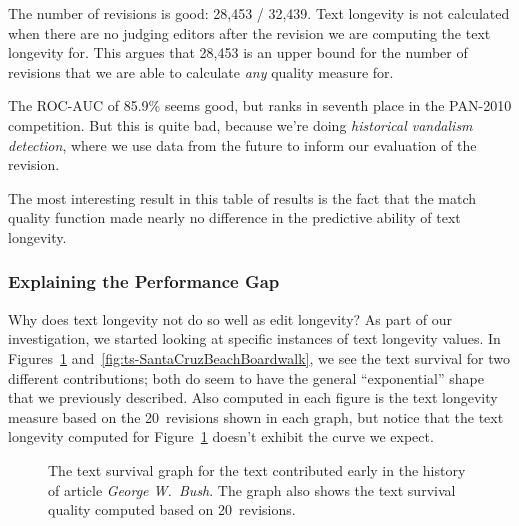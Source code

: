 The number of revisions is good: 28,453 / 32,439.
Text longevity is not calculated when there are no
judging editors after the revision we are computing
the text longevity for.
This argues that 28,453 is an upper bound for the number
of revisions that we are able to calculate \textit{any}
quality measure for.

The ROC-AUC of 85.9\% seems good, but ranks in seventh place
in the PAN-2010 competition.
But this is quite bad, because we're doing \textit{historical
vandalism detection}, where we use data from the future to
inform our evaluation of the revision.

The most interesting result in this table of results
is the fact that the match quality function made
nearly no difference in the predictive ability of
text longevity.




\subsubsection{Explaining the Performance Gap}

Why does text longevity not do so well as edit longevity?
As part of our investigation, we started looking at specific
instances of text longevity values.
In Figures~\ref{fig:ts-GeorgeWBush} and~\ref{fig:ts-SantaCruzBeachBoardwalk},
we see the text survival for two different contributions;
both do seem to have the general ``exponential'' shape
that we previously described.
Also computed in each figure is the text longevity measure based on
the 20~revisions shown in each graph, but notice that the text
longevity computed for
Figure~\ref{fig:ts-GeorgeWBush} doesn't exhibit the curve we expect.

\begin{figure}[tbph]
\centering
{}
\caption{The text survival graph for the text contributed early
        in the history of article \textit{George W.~Bush}.
	The graph also shows the text survival quality
	computed based on 20~revisions.
	}
\label{fig:ts-GeorgeWBush}
\end{figure}

